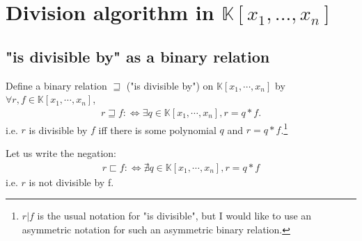 \documentclass[11pt]{book}
\begin{document}
\section{Division algorithm in $\mathbb{K}[x_1, ... , x_n]$}
\subsection{"is divisible by" as a binary relation}
\label{isDivisibleBy}
Define a binary relation $\sqsupseteq$ ("is divisible by") on $\mathbb{K}[x_1, \cdots, x_n]$ by $\forall r,f \in \mathbb{K}[x_1, \cdots, x_n]$,
\begin{eqnarray}
r \sqsupseteq f :\Leftrightarrow \exists q \in \mathbb{K}[x_1, \cdots, x_n], r = q*f.
\end{eqnarray}
i.e. $r$ is divisible by $f$ iff there is some polynomial $q$ and $r = q*f$.\footnote{$r|f$ is the usual notation for "is divisible", but I would like to use an asymmetric notation for such an asymmetric binary relation.}

Let us write the negation:
\begin{eqnarray}
r \sqsubset f :\Leftrightarrow \nexists q \in \mathbb{K}[x_1, \cdots, x_n], r = q*f
\end{eqnarray}
i.e. $r$ is not divisible by f.

\end{document}
